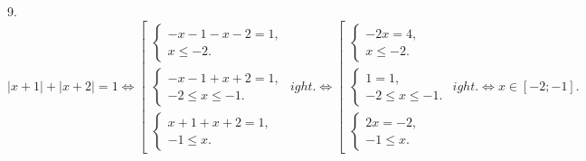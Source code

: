 9. $|x+1|+|x+2|=1\Leftrightarrow \left[\begin{array}{l}\begin{cases} -x-1-x-2=1,\\ x\leqslant -2.\end{cases}\\
\begin{cases} -x-1+x+2=1,\\ -2\leqslant x\leqslant -1 .\end{cases}\\\begin{cases} x+1+x+2=1,\\ -1\leqslant x.\end{cases}\end{array}
ight.\Leftrightarrow
 \left[\begin{array}{l}\begin{cases} -2x=4,\\ x\leqslant -2.\end{cases}\\
\begin{cases} 1=1,\\ -2\leqslant x\leqslant -1 .\end{cases}\\\begin{cases} 2x=-2,\\ -1\leqslant x.\end{cases}\end{array}
ight.\Leftrightarrow
x\in [-2;-1].$\\
